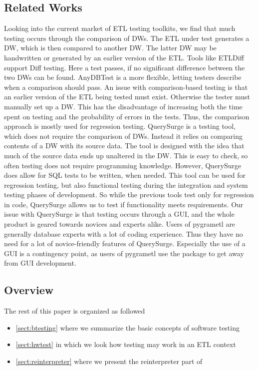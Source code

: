 \subsection{Related Works}
Looking into the current market of ETL testing toolkits, we find that much testing occurs through the comparison of DWs. The ETL under test generates a DW, which is then compared to another DW. The latter DW may be handwritten or generated by an earlier version of the ETL. Tools like ETLDiff\cite{thomsen2006etldiff} support Diff testing. Here a test passes, if no significant difference between the two DWs can be found. AnyDBTest\cite{AnyDbTest} is a more flexible, letting testers describe when a comparison should pass. An issue with comparison-based testing is that an earlier version of the ETL being tested must exist. Otherwise the tester must manually set up a DW. This has the disadvantage of increasing both the time spent on testing and the probability of errors in the tests. Thus, the comparison approach is mostly used for  regression testing. QuerySurge\cite{QuerySurge} is a testing tool, which does not require the comparison of DWs. Instead it relies on comparing contents of a DW with its source data. The tool is designed with the idea that much of the source data ends up unaltered in the DW. This is easy to check, so often testing does not require programming knowledge. However, QuerySurge does allow for SQL tests to be written, when needed. This tool can be used for regression testing, but also functional testing during the integration and system testing phases of development. So while the previous tools test only for regression in code, QuerySurge allows us to test if functionality meets requirements. Our issue with QuerySurge is that testing occurs through a GUI, and the whole product is geared towards novices and experts alike. Users of pygrametl are generally database experts with a lot of coding experience. Thus they have no need for a lot of novice-friendly features of QuerySurge. Especially the use of a GUI is a contingency point, as users of pygrametl use the package to get away from GUI development. 

\subsection{Overview}
The rest of this paper is organized as followed
\begin{itemize}
	\item{\cref{sect:btesting} where we summarize the basic concepts of software testing}
	\item{\cref{sect:hwtest} in which we look how testing may work in an ETL context}
	\item{\cref{sect:reinterpreter} where we present the reinterpreter part of \FW}
\end{itemize}

